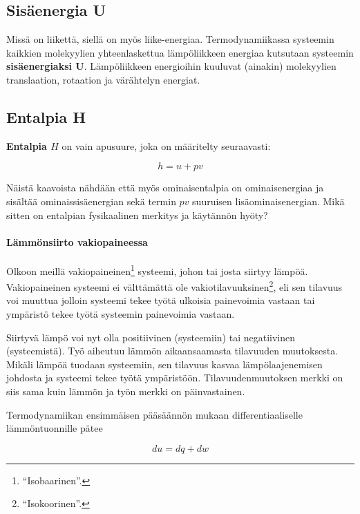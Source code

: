 \documentclass[12pt,a4paper,finnish]{book}
\begin{document}
\subsection{Sisäenergia U}

Missä on liikettä, siellä on myös liike-energiaa. Termodynamiikassa systeemin kaikkien molekyylien yhteenlaskettua lämpöliikkeen 
energiaa kutsutaan systeemin \textbf{sisäenergiaksi U}. Lämpöliikkeen energioihin kuuluvat (ainakin) 
molekyylien translaation, rotaation ja värähtelyn energiat.

\subsection{Entalpia H} \label{def:H} %

\textbf{Entalpia $H$} on vain apusuure, joka on määritelty seuraavasti:

\begin{equation}
 h = u + pv
\end{equation}

Näistä kaavoista nähdään että myös ominaisentalpia on ominaisenergiaa ja sisältää ominaissisäenergian sekä termin $pv$ 
suuruisen lisäominaisenergian. Mikä sitten on entalpian fysikaalinen merkitys ja käytännön hyöty?


\paragraph{Lämmönsiirto vakiopaineessa}

Olkoon meillä vakiopaineinen\footnote{``Isobaarinen''.} systeemi, johon tai josta siirtyy lämpöä. Vakiopaineinen systeemi 
ei välttämättä ole vakiotilavuuksinen\footnote{``Isokoorinen''.}, eli sen tilavuus voi muuttua jolloin systeemi tekee 
työtä ulkoisia painevoimia vastaan tai ympäristö tekee työtä systeemin painevoimia vastaan. 

Siirtyvä lämpö voi nyt  
olla positiivinen (systeemiin) tai negatiivinen (systeemistä). Työ aiheutuu lämmön aikaansaamasta tilavuuden muutoksesta. 
Mikäli lämpöä tuodaan systeemiin, sen tilavuus kasvaa lämpölaajenemisen johdosta ja systeemi tekee työtä ympäristöön. 
Tilavuudenmuutoksen merkki on siis sama kuin lämmön ja työn merkki on päinvastainen.

Termodynamiikan ensimmäisen pääsäännön mukaan differentiaaliselle lämmöntuonnille pätee

\begin{equation}
 du = dq + dw
\end{equation}
\end{document}
